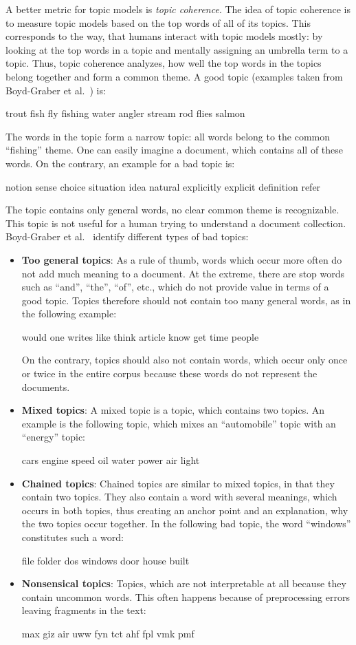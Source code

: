 \documentclass[
        a4paper,
        titlepage,
        twoside,
        parskip,
        numbers=noenddot
        ]{scrbook}
\newcommand{\topicbox}[1]{
  \setlength{\OuterFrameSep}{0pt}
  \begin{framed}
    #1
  \end{framed}
}
\newcommand{\topicboxList}[1]{
  \setlength{\OuterFrameSep}{0pt}
  \newline
  \begin{minipage}{\linewidth}
    \vspace{6pt}
    \begin{framed}
      #1
    \end{framed}
    \vspace{6pt}
  \end{minipage}
}
\theoremstyle{break}
\begin{document}
A better metric for topic models is \emph{topic coherence}.
The idea of topic coherence is to measure topic models based on the top words of all of its topics.
This corresponds to the way, that humans interact with topic models mostly: by looking at the top words in a topic and mentally assigning an umbrella term to a topic.
Thus, topic coherence analyzes, how well the top words in the topics belong together and form a common theme.
A good topic (examples taken from Boyd-Graber et al.~\cite{Boyd-graber2014}) is:
\topicbox{trout fish fly fishing water angler stream rod flies salmon}
The words in the topic form a narrow topic: all words belong to the common ``fishing'' theme.
One can easily imagine a document, which contains all of these words.
On the contrary, an example for a bad topic is:
\topicbox{notion sense choice situation idea natural explicitly explicit definition refer}
The topic contains only general words, no clear common theme is recognizable.
This topic is not useful for a human trying to understand a document collection.
Boyd-Graber et al.~\cite{Boyd-graber2014} identify different types of bad topics:
\begin{itemize}
  \item
    \textbf{Too general topics}: As a rule of thumb, words which occur more often do not add much meaning to a document.
    At the extreme, there are stop words such as ``and'', ``the'', ``of'', etc., which do not provide value in terms of a good topic.
    Topics therefore should not contain too many general words, as in the following example:
    \topicboxList{would one writes like think article know get time people}
    On the contrary, topics should also not contain words, which occur only once or twice in the entire corpus because these words do not represent the documents.
  \item
    \textbf{Mixed topics}: A mixed topic is a topic, which contains two topics.
    An example is the following topic, which mixes an ``automobile'' topic with an ``energy'' topic:
    \topicboxList{cars engine speed oil water power air light}
  \item
    \textbf{Chained topics}: Chained topics are similar to mixed topics, in that they contain two topics.
    They also contain a word with several meanings, which occurs in both topics, thus creating an anchor point and an explanation, why the two topics occur together.
    In the following bad topic, the word ``windows'' constitutes such a word:
    \topicboxList{file folder dos windows door house built}
  \item
    \textbf{Nonsensical topics}:
    Topics, which are not interpretable at all because they contain uncommon words.
    This often happens because of preprocessing errors leaving fragments in the text:
    \topicboxList{max giz air uww fyn tct ahf fpl vmk pmf}
\end{itemize}
\end{document}
